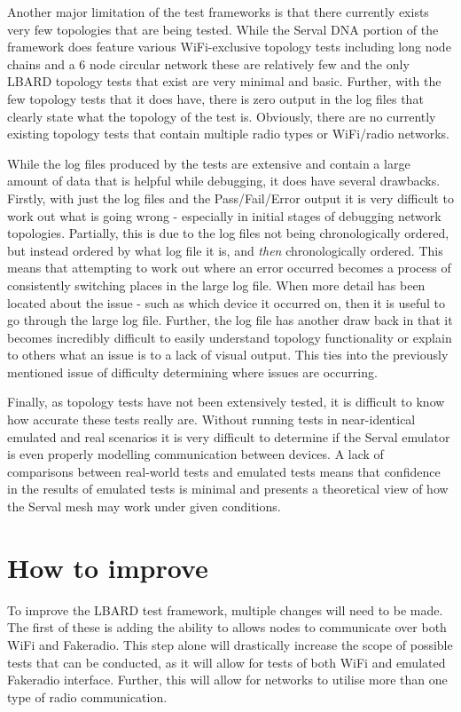 Another major limitation of the test frameworks is that there currently exists very few topologies that are being tested.
While the Serval DNA portion of the framework does feature various WiFi-exclusive topology tests including long node chains and a 6 node circular network these are relatively few and the only LBARD topology tests that exist are very minimal and basic.
Further, with the few topology tests that it does have, there is zero output in the log files that clearly state what the topology of the test is. 
Obviously, there are no currently existing topology tests that contain multiple radio types or WiFi/radio networks.

While the log files produced by the tests are extensive and contain a large amount of data that is helpful while debugging, it does have several drawbacks. 
Firstly, with just the log files and the Pass/Fail/Error output it is very difficult to work out what is going wrong - especially in initial stages of debugging network topologies.
Partially, this is due to the log files not being chronologically ordered, but instead ordered by what log file it is, and \emph{then} chronologically ordered.
This means that attempting to work out where an error occurred becomes a process of consistently switching places in the large log file.
When more detail has been located about the issue - such as which device it occurred on, then it is useful to go through the large log file.
Further, the log file has another draw back in that it becomes incredibly difficult to easily understand topology functionality or explain to others what an issue is to a lack of visual output.
This ties into the previously mentioned issue of difficulty determining where issues are occurring.

Finally, as topology tests have not been extensively tested, it is difficult to know how accurate these tests really are.
Without running tests in near-identical emulated and real scenarios it is very difficult to determine if the Serval emulator is even properly modelling communication between devices. 
A lack of comparisons between real-world tests and emulated tests means that confidence in the results of emulated tests is minimal and presents a theoretical view of how the Serval mesh may work under given conditions. 


\section{How to improve}
To improve the LBARD test framework, multiple changes will need to be made.
The first of these is adding the ability to allows nodes to communicate over both WiFi and Fakeradio. 
This step alone will drastically increase the scope of possible tests that can be conducted, as it will allow for tests of both WiFi and emulated Fakeradio interface.
Further, this will allow for networks to utilise more than one type of radio communication.

